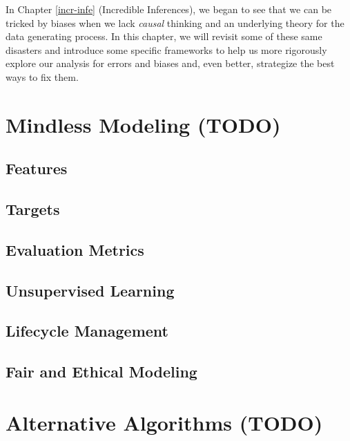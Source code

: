 \documentclass[
]{krantz}
\begin{document}
In Chapter \ref{incr-infe} (Incredible Inferences), we began to see that we can be tricked by biases when we lack \emph{causal} thinking and an underlying theory for the data generating process. In this chapter, we will revisit some of these same disasters and introduce some specific frameworks to help us more rigorously explore our analysis for errors and biases and, even better, strategize the best ways to fix them.

\hypertarget{mind-mod}{%
\chapter{Mindless Modeling (TODO)}\label{mind-mod}}

\hypertarget{features}{%
\section{Features}\label{features}}

\hypertarget{targets}{%
\section{Targets}\label{targets}}

\hypertarget{evaluation-metrics}{%
\section{Evaluation Metrics}\label{evaluation-metrics}}

\hypertarget{unsupervised-learning}{%
\section{Unsupervised Learning}\label{unsupervised-learning}}

\hypertarget{lifecycle-management}{%
\section{Lifecycle Management}\label{lifecycle-management}}

\hypertarget{fair-and-ethical-modeling}{%
\section{Fair and Ethical Modeling}\label{fair-and-ethical-modeling}}

\hypertarget{alt-alg}{%
\chapter{Alternative Algorithms (TODO)}\label{alt-alg}}
\end{document}
